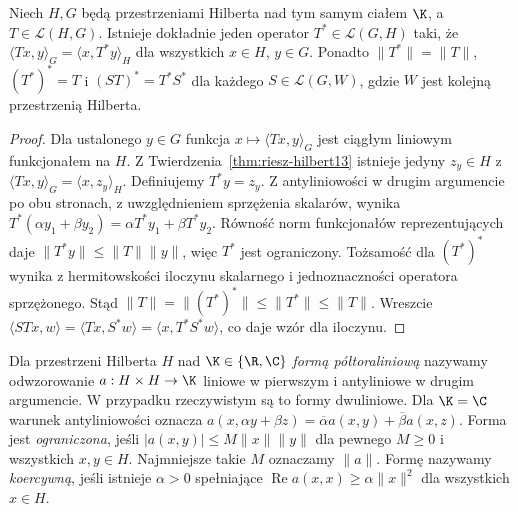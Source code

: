 \begin{twierdzenie}
\label{thm:adjoint13}
Niech $H,G$ będą przestrzeniami Hilberta nad tym samym ciałem $\K$,
a $T\in\mathcal L(H,G)$. Istnieje dokładnie jeden operator
$T^*\in\mathcal L(G,H)$ taki, że
$\langle Tx,y\rangle_G=\langle x,T^*y\rangle_H$
dla wszystkich $x\in H$, $y\in G$.
Ponadto $\|T^*\|=\|T\|$, $(T^*)^*=T$ i
$(ST)^*=T^*S^*$ dla każdego $S\in\mathcal L(G,W)$,
gdzie $W$ jest kolejną przestrzenią Hilberta.
\end{twierdzenie}
\begin{proof}
Dla ustalonego $y\in G$ funkcja $x\mapsto\langle Tx,y\rangle_G$
jest ciągłym liniowym funkcjonałem na $H$. Z
Twierdzenia~\ref{thm:riesz-hilbert13} istnieje jedyny $z_y\in H$
z $\langle Tx,y\rangle_G=\langle x,z_y\rangle_H$.
Definiujemy $T^*y=z_y$. Z antyliniowości w drugim argumencie
po obu stronach, z uwzględnieniem sprzężenia skalarów, wynika
$T^*(\alpha y_1+\beta y_2)=\alpha T^*y_1+\beta T^*y_2$.
Równość norm funkcjonałów reprezentujących daje
$\|T^*y\|\le\|T\|\|y\|$, więc $T^*$ jest ograniczony.
Tożsamość dla $(T^*)^*$ wynika z hermitowskości iloczynu
skalarnego i jednoznaczności operatora sprzężonego.
Stąd $\|T\|=\|(T^*)^*\|\le\|T^*\|\le\|T\|$.
Wreszcie
$\langle STx,w\rangle=\langle Tx,S^*w\rangle
=\langle x,T^*S^*w\rangle$, co daje wzór dla iloczynu.
\end{proof}

\begin{definicja}
\label{def:sesquilinear13}
Dla przestrzeni Hilberta $H$ nad $\K\in\{\R,\C\}$
\emph{formą półtoraliniową} nazywamy odwzorowanie
$a:H\times H\to\K$ liniowe w pierwszym i antyliniowe
w drugim argumencie. W przypadku rzeczywistym są to formy
dwuliniowe. Dla $\K=\C$ warunek antyliniowości oznacza
$a(x,\alpha y+\beta z)=\overline\alpha a(x,y)+\overline\beta a(x,z)$. Forma jest \emph{ograniczona}, jeśli
$|a(x,y)|\le M\|x\|\|y\|$ dla pewnego $M\ge0$ i wszystkich
$x,y\in H$. Najmniejsze takie $M$ oznaczamy $\|a\|$.
Formę nazywamy \emph{koercywną}, jeśli istnieje $\alpha>0$
spełniające $\operatorname{Re}a(x,x)\ge\alpha\|x\|^2$
dla wszystkich $x\in H$.
\end{definicja}

